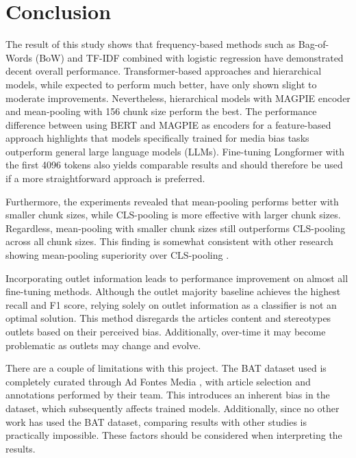 \chapter{Conclusion}
\label{cha:6}

The result of this study shows that frequency-based methods such as Bag-of-Words (BoW) and TF-IDF combined with logistic regression have demonstrated decent overall performance. Transformer-based approaches and hierarchical models, while expected to perform much better, have only shown slight to moderate improvements. Nevertheless, hierarchical models with MAGPIE encoder and mean-pooling with 156 chunk size perform the best. The performance difference between using BERT and MAGPIE as encoders for a feature-based approach highlights that models specifically trained for media bias tasks outperform general large language models (LLMs). Fine-tuning Longformer with the first 4096 tokens also yields comparable results and should therefore be used if a more straightforward approach is preferred.

Furthermore, the experiments revealed that mean-pooling performs better with smaller chunk sizes, while CLS-pooling is more effective with larger chunk sizes. Regardless, mean-pooling with smaller chunk sizes still outperforms CLS-pooling across all chunk sizes. This finding is somewhat consistent with other research showing mean-pooling superiority over CLS-pooling \cite{rodrigo-2024-systematic-review-media-bias}.

Incorporating outlet information leads to performance improvement on almost all fine-tuning methods. Although the outlet majority baseline achieves the highest recall and F1 score, relying solely on outlet information as a classifier is not an optimal solution. This method disregards the articles content and stereotypes outlets based on their perceived bias. Additionally, over-time it may become problematic as outlets may change and evolve.

There are a couple of limitations with this project. The BAT dataset used is completely curated through Ad Fontes Media \cite{adfontes}, with article selection and annotations performed by their team. This introduces an inherent bias in the dataset, which subsequently affects trained models. Additionally, since no other work has used the BAT dataset, comparing results with other studies is practically impossible. These factors should be considered when interpreting the results.


